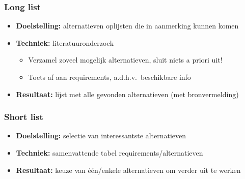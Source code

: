 \documentclass[aspectratio=169]{beamer}
\begin{document}
\begin{frame}[plain]
  \frametitle{Long list}

  \begin{itemize}
    \item \textbf{Doelstelling:} alternatieven oplijsten die in aanmerking kunnen komen
    \item \textbf{Techniek:} literatuuronderzoek
          \begin{itemize}
            \item Verzamel zoveel mogelijk alternatieven, sluit niets a priori uit!
            \item Toets af aan requirements, a.d.h.v.\ beschikbare info
          \end{itemize}
    \item \textbf{Resultaat:} lijst met alle gevonden alternatieven (met bronvermelding)
  \end{itemize}

\end{frame}

\begin{frame}
  \frametitle{Short list}

  \begin{itemize}
    \item \textbf{Doelstelling:} selectie van interessantste alternatieven
    \item \textbf{Techniek:} samenvattende tabel requirements/alternatieven
    \item \textbf{Resultaat:} keuze van één/enkele alternatieven om verder uit te werken
  \end{itemize}

\end{frame}
\end{document}
